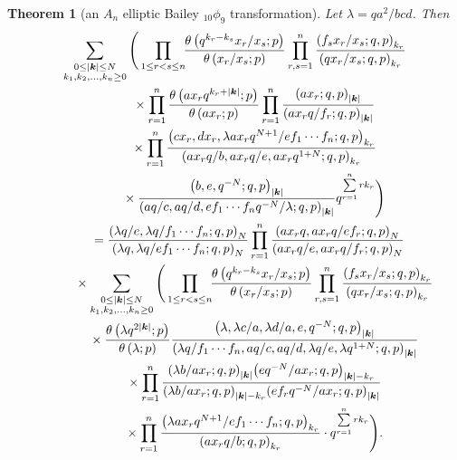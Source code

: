 \documentclass[pdftex]{sigma}
\numberwithin{equation}{section}
\newtheorem{Theorem}{Theorem}[section]
\newcommand\sumk{{\left| \boldsymbol{k} \right|}}
\newcommand{\triprod}[1]{\prod\limits_{1\le r < s \le #1}}
\newcommand{\sqprod}[1]{\prod\limits_{r, s =1}^{#1}} %
\newcommand{\smallprod}[1]{\prod\limits_{r =1}^{#1}} %
\newcommand{\xover}[1]{#1_{r}/#1_{s}}
\newcommand{\ellipticqrfac}[2]{{\left({#1}; q, p\right)_{#2}}} %
\newcommand{\elliptictheta}[1]{\theta \left({#1} ; p\right) }
\newcommand{\ellipticvandermonde}[3]{\triprod{#3} %
\!\! \frac{\elliptictheta{q^{#2_r-#2_s} \xover {#1} }}{\elliptictheta{\xover{#1}}}
}
\begin{document}
\begin{Theorem}[an $A_n$ elliptic Bailey $_{10}\phi_9$ transformation] \label{th:e-10p9-6-tetra}
Let $\lambda = qa^2/bcd$. Then
\begin{gather}
\sum\limits_{\substack{0\leq \sumk\leq N \\ k_1,k_2, \dots, k_n\geq 0} }
 \Bigg( \ellipticvandermonde{x}{k}{n} \sqprod n \frac{\ellipticqrfac{f_s\xover{x}}{k_r} }{\ellipticqrfac{q\xover{x}}{k_r} } \notag \\
\qquad\quad{} \times \smallprod n \frac{\elliptictheta{a x_r q^{k_r+\sumk}}}{\elliptictheta{a x_r}}
 \smallprod n \frac{\ellipticqrfac{a x_r}{\sumk}} {\ellipticqrfac{a x_rq/f_r}{\sumk}} \notag\\
\qquad\quad{} \times \smallprod n \frac{\ellipticqrfac{cx_r, dx_r, \lambda ax_r q^{N+1}/ef_1\cdots f_n}{k_r}}
 {\ellipticqrfac{a x_rq/b, a x_rq/e, ax_rq^{1+N}}{k_r}} \notag\\
\qquad\quad{} \times \frac{\ellipticqrfac{b, e, q^{-N}}{\sumk}}
{\ellipticqrfac{aq/c, aq/d, ef_1\cdots f_n q^{-N}/\lambda}{\sumk}}
q^{\sum\limits_{r=1}^n r k_r} \Bigg) \notag \\
\qquad{} = \frac{\ellipticqrfac{\lambda q/e, \lambda q/f_1\cdots f_n}{N}}{\ellipticqrfac{ \lambda q, \lambda q/ef_1\cdots f_n}{N}}
\smallprod n \frac{\ellipticqrfac{a x_rq, a x_r q/ef_r}{N}} {\ellipticqrfac{a x_rq/e, a x_rq/f_r}{N}}\notag \\
\qquad\quad{} \times \sum\limits_{\substack{0\leq \sumk\leq N \\ k_1,k_2, \dots, k_n\geq 0} }
\Bigg( \ellipticvandermonde{x}{k}{n} \sqprod n \frac{\ellipticqrfac{f_s\xover{x}}{k_r} }{\ellipticqrfac{q\xover{x}}{k_r} } \notag \\
\qquad\quad{} \times \frac{\elliptictheta{\lambda q^{2\sumk}}}{\elliptictheta{\lambda }}
\frac{\ellipticqrfac{\lambda ,\lambda c/a, \lambda d/a, e, q^{-N}}{\sumk}}
{\ellipticqrfac{\lambda q/f_1\cdots f_n, aq/c, aq/d, \lambda q/e, \lambda q^{1+N}}{\sumk}}\nonumber\\
\qquad\quad{} \times
\smallprod n \frac{\ellipticqrfac{\lambda b/ax_r}{\sumk} \ellipticqrfac{eq^{-N}/ax_r}{\sumk-k_r}}{\ellipticqrfac{\lambda b/ax_r}{\sumk-k_r} \ellipticqrfac{ef_rq^{-N}/ax_r}{\sumk}}\notag \\
\qquad\quad {} \times \smallprod n \frac{\ellipticqrfac{\lambda a x_r q^{N+1}/ef_1\cdots f_n}{k_r}}
{\ellipticqrfac{ax_rq/b}{k_r} }\cdot q^{\sum\limits_{r=1}^n r k_r} \Bigg). \label{e-10p9-6-tetra}
\end{gather}
\end{Theorem}
\end{document}
